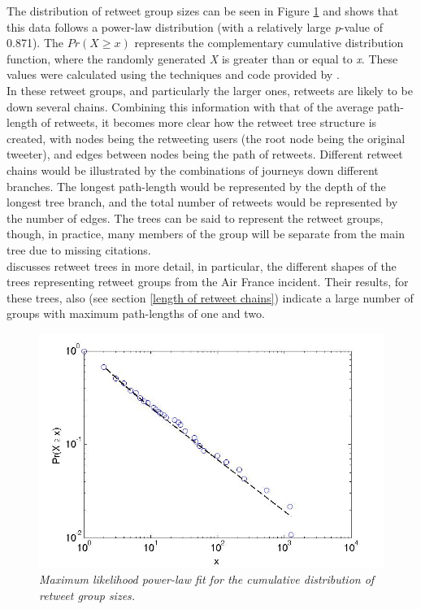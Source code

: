 The distribution of retweet group sizes can be seen in Figure \ref{fig:retweet-distribution} and shows that this data follows a power-law distribution (with a relatively large \textit{p}-value of 0.871). The $Pr(X \geq x)$ represents the complementary cumulative distribution function, where the randomly generated \textit{X} is greater than or equal to \textit{x}. These values were calculated using the techniques and code provided by \cite{clauset07}.\\
In these retweet groups, and particularly the larger ones, retweets are likely to be down several chains. Combining this information with that of the average path-length of retweets, it becomes more clear how the retweet tree structure is created, with nodes being the retweeting users (the root node being the original tweeter), and edges between nodes being the path of retweets. Different retweet chains would be illustrated by the combinations of journeys down different branches. The longest path-length would be represented by the depth of the longest tree branch, and the total number of retweets would be represented by the number of edges. The trees can be said to represent the retweet groups, though, in practice, many members of the group will be separate from the main tree due to missing citations.\\
\cite{kwak10} discusses retweet trees in more detail, in particular, the different shapes of the trees representing retweet groups from the Air France incident. Their results, for these trees, also (see section \ref{length of retweet chains}) indicate a large number of groups with maximum path-lengths of one and two.\\
\begin{figure}[h]
\includegraphics[scale=0.35]{4.Chapter1/Media/retweets-distribution-stats.jpg} 
\caption{\textit{Maximum likelihood power-law fit for the cumulative distribution of retweet group sizes.}}
\label{fig:retweet-distribution}
\end{figure}
